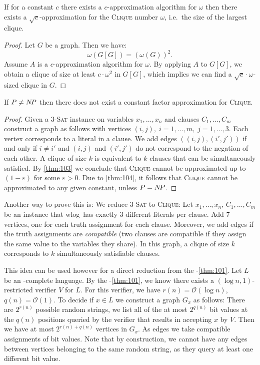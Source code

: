 \documentclass[../skript.tex]{subfiles}
\begin{document}
\begin{proposition} %
\label{thm:104}
If for a constant $c$ there exists a $c$-approximation algorithm for $\omega$ then there exists a $\sqrt{c}$-approximation for the \textsc{Clique} number $\omega$, i.e.\ the size of the largest clique.
\end{proposition}
\begin{proof}
Let $G$ be a graph. Then we have:
\[
	\omega(G[G]) = (\omega(G))^2.
\]
Assume $A$ is a $c$-approximation algorithm for $\omega$. By applying $A$ to $G[G]$, we obtain a clique of size at least $c \cdot \omega^2$ in $G[G]$, which implies we can find a $\sqrt{c}\cdot \omega$-sized clique in $G$.
\end{proof}
\begin{theorem} %
\label{thm:105}
If $P \neq N \! P$ then there does not exist a constant factor approximation for \textsc{Clique}.
\end{theorem}
\begin{proof}
Given a \textsc{3-Sat} instance on variables $x_1, \ldots, x_n$ and clauses $C_1, \ldots, C_m$ construct a graph as follows with vertices $(i, j), \; i = 1, \ldots, m, \; j = 1, \ldots, 3$.
Each vertex corresponds to a literal in a clause.
We add edges $\left( (i, j), (i', j') \right)$ if and only if $i \neq i'$ and $(i, j)$ and $(i', j')$ do not correspond to the negation of each other.
A clique of size $k$ is equivalent to $k$ clauses that can be simultaneously satisfied.
By \cref{thm:103} we conclude that \textsc{Clique} cannot be approximated up to $(1-\varepsilon)$ for some $\varepsilon > 0$.
Due to \cref{thm:104}, it follows that \textsc{Clique} cannot be approximated to any given constant, unless $P = N \! P$.
\end{proof}
Another way to prove this is:
We reduce \textsc{3-Sat} to \textsc{Clique}: Let $x_1, \ldots, x_n$, $C_1, \ldots, C_m$ be an instance that \ac{wlog}\ has exactly 3 different literals per clause.
Add 7 vertices, one for each truth assignment for each clause. Moreover, we add edges if the truth assignments are \emph{compatible} (two clauses are compatible if they assign the same value to the variables they share).
In this graph, a clique of size $k$ corresponds to $k$ simultaneously satisfiable clauses.

This idea can be used however for a direct reduction from the \PCP-\cref{thm:101}.
Let $L$ be an \NP-complete language. By the \PCP-\cref{thm:101}, we know there exists a $(\log n, 1)$-restricted verifier $V$ for $L$. For this verifier, we have $r(n) = \mathcal{O}(\log n)$, $q(n) = \mathcal{O}(1)$.
To decide if $x \in L$ we construct a graph $G_x$ as follows:
There are $2^{r(n)}$ possible random strings, we list all of the at most $2^{q(n)}$ bit values at the $q(n)$ positions queried by the verifier that results in accepting $x$ by $V$.
Then we have at most $2^{r(n) + q(n)}$ vertices in $G_x$. As edges we take compatible assignments of bit values. Note that by construction, we cannot have any edges between vertices belonging to the same random string, as they query at least one different bit value.
\end{document}

